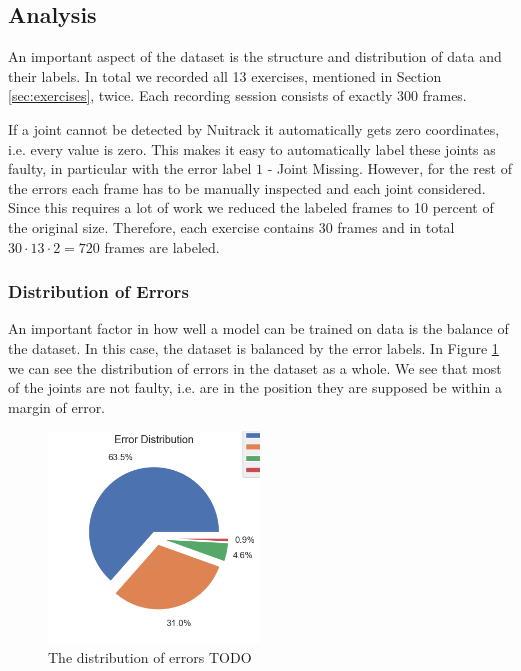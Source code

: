 \subsection{Analysis}

An important aspect of the dataset is the structure and distribution of data and their labels. In total we recorded all 13 exercises, mentioned in Section \ref{sec:exercises}, twice. Each recording session consists of exactly 300 frames.

If a joint cannot be detected by Nuitrack it automatically gets zero coordinates, i.e. every value is zero. This makes it easy to automatically label these joints as faulty, in particular with the error label $1$ - Joint Missing. However, for the rest of the errors each frame has to be manually inspected and each joint considered. Since this requires a lot of work we reduced the labeled frames to 10 percent of the original size. Therefore, each exercise contains 30 frames and in total $30 \cdot 13 \cdot 2 = 720$ frames are labeled. 

\subsubsection{Distribution of Errors}

An important factor in how well a model can be trained on data is the balance of the dataset. In this case, the dataset is balanced by the error labels. In Figure \ref{fig:statistics_err_dist} we can see the distribution of errors in the dataset as a whole. We see that most of the joints are not faulty, i.e. are in the position they are supposed be within a margin of error.

\begin{figure}
  \centering
  \includegraphics[width=0.5\textwidth]{figures/Data/Error_Distribution.png}
  \caption[Error Distribution]{The distribution of errors TODO}
  \label{fig:statistics_err_dist}
\end{figure}

